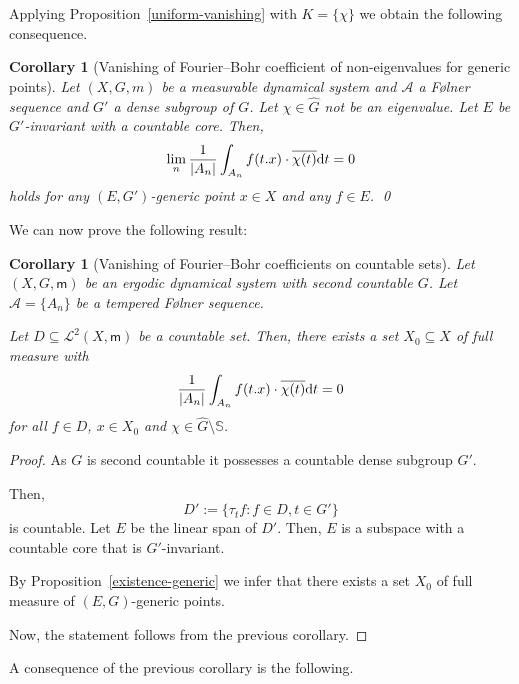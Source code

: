\documentclass [14pt]{amsart}
\numberwithin{equation}{section}
\newcommand{\cA}{{\mathcal A}}
\newcommand{\mm}{\mathsf{m}}
\newcommand{\dd}{\mbox{\rm d}}
\newcommand{\SSS}{\mathbb S}
\newtheorem{corollary}[theorem]{Corollary}
\begin{document}
Applying Proposition~\ref{uniform-vanishing} with  $K= \{ \chi \}$ we obtain the following consequence.

	
\begin{corollary}[Vanishing of Fourier--Bohr coefficient of non-eigenvalues for generic points] \label{cor-van}
 Let $(X,G,m)$ be a measurable dynamical system and $\cA$ a F\o lner sequence and $G'$ a dense subgroup of $G$. Let $\chi\in \widehat{G}$ not be an eigenvalue.   Let $E$ be   $G'$-invariant with a countable core. Then,
$$\lim_n \frac{1}{|A_n|} \int_{A_n}  f(t.x) \cdot \overline{\chi(t)}  \dd t =0$$
holds for any $(E,G')$-generic point $x \in X$ and any $f \in E$. \qed
\end{corollary}

\medskip
We can now prove the following result:

\begin{corollary}[Vanishing of Fourier--Bohr coefficients on countable sets] \label{cor-van-fb-d} Let $(X,G,\mm)$ be an ergodic dynamical system with second countable $G$. Let  $\cA =\{ A_n \}$ be a tempered F\o lner sequence.

Let $D \subseteq \mathcal{L}^2 (X, \mm)$ be a countable set. Then, there exists a set $X_0 \subseteq X$ of full measure with
\[
\frac{1}{|A_n|} \int_{A_n}  f(t.x) \cdot \overline{\chi(t)}  \dd t =0
\]
for all $f\in D$, $x\in X_0$  and $\chi \in \widehat{G}\setminus \SSS$.
\end{corollary}
\begin{proof}   As $G$ is second countable it possesses a countable dense subgroup $G'$.

Then,
\[
D':=\{ \tau_t f : f\in D, t\in G'\}
\]
is countable. Let $E$ be the linear span of $D'$. Then, $E$ is a subspace with a countable core that is $G'$-invariant.

By Proposition~\ref{existence-generic} we infer that there exists a set $X_0$ of full measure of $(E,G)$-generic points.

Now, the statement follows from the previous corollary.
\end{proof}


A consequence of the previous corollary   is the following.
\end{document}
